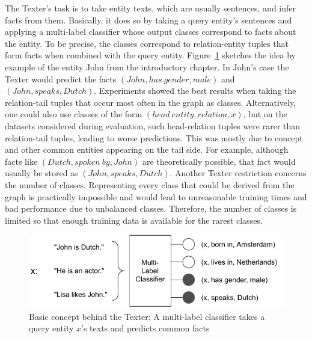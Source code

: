 The Texter's task is to take entity texts, which are usually sentences, and infer facts from them. Basically, it does so by taking a query entity's sentences and applying a multi-label classifier whose output classes correspond to facts about the entity. To be precise, the classes correspond to relation-entity tuples that form facts when combined with the query entity. Figure~\ref{fig:4_approach/1_texter/texter_idea} sketches the idea by example of the entity John from the introductory chapter. In John's case the Texter would predict the facts $(John, has~gender, male)$ and $(John, speaks, Dutch)$. Experiments showed the best results when taking the relation-tail tuples that occur most often in the graph as classes. Alternatively, one could also use classes of the form $(head~entity, relation, x)$, but on the datasets considered during evaluation, such head-relation tuples were rarer than relation-tail tuples, leading to worse predictions. This was mostly due to concept and other common entities appearing on the tail side. For example, although facts like $(Dutch, spoken~by, John)$ are theoretically possible, that fact would usually be stored as $(John, speaks, Dutch)$. Another Texter restriction concerns the number of classes. Representing every class that could be derived from the graph is practically impossible and would lead to unreasonable training times and bad performance due to unbalanced classes. Therefore, the number of classes is limited so that enough training data is available for the rarest classes.

\begin{figure}[t]
    \centering
    \includegraphics[width=\textwidth]{4_approach/1_texter/texter_idea}
    \caption{Basic concept behind the Texter: A multi-label classifier takes a query entity $x$'s texts and predicts common facts}
    \label{fig:4_approach/1_texter/texter_idea}
\end{figure}

